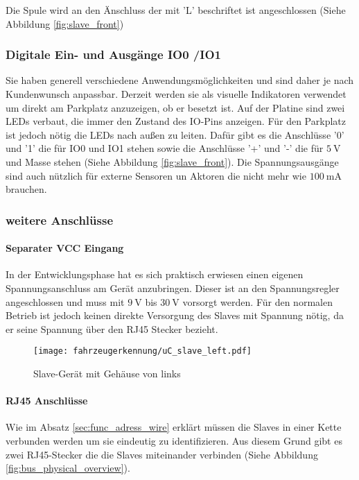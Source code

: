 Die Spule wird an den Änschluss der mit 'L' beschriftet ist angeschlossen (Siehe Abbildung \ref{fig:slave_front})

\subsubsection{Digitale Ein- und Ausgänge IO0 /IO1}

Sie haben generell verschiedene Anwendungsmöglichkeiten und sind daher je nach Kundenwunsch anpassbar. Derzeit werden sie als visuelle Indikatoren verwendet um direkt am Parkplatz anzuzeigen, ob er besetzt ist. 
Auf der Platine sind zwei LEDs verbaut, die immer den Zustand des IO-Pins anzeigen. Für den Parkplatz ist jedoch nötig die LEDs nach außen zu leiten. Dafür gibt es die Anschlüsse '0' und '1' die für IO0 und IO1 stehen sowie die Anschlüsse
'+' und '-' die für $\SI{5}{\volt}$ und Masse stehen (Siehe Abbildung \ref{fig:slave_front}). Die Spannungsausgänge sind auch nützlich für externe Sensoren un Aktoren die nicht mehr wie $\SI{100}{\milli\ampere}$ brauchen.

\subsubsection{weitere Anschlüsse}
\paragraph{Separater VCC Eingang}\mbox{} 

In der Entwicklungsphase hat es sich praktisch erwiesen einen eigenen Spannungsanschluss am Gerät anzubringen. Dieser ist an den Spannungsregler angeschlossen und muss mit $\SI{9}{\volt}$ bis $\SI{30}{\volt}$ vorsorgt werden.
Für den normalen Betrieb ist jedoch keinen direkte Versorgung des Slaves mit Spannung nötig, da er seine Spannung über den RJ45 Stecker bezieht.

\begin{figure}[H]
    \centering
    \texttt{[image: fahrzeugerkennung/uC\_slave\_left.pdf]}
    \caption{Slave-Gerät mit Gehäuse von links}
    \label{fig:slave_left}
\end{figure}

\paragraph{RJ45 Anschlüsse}\mbox{} 

Wie im Absatz \ref{sec:func_adress_wire} erklärt müssen die Slaves in einer Kette verbunden werden um sie eindeutig zu identifizieren. Aus diesem Grund gibt es zwei RJ45-Stecker die die Slaves miteinander verbinden (Siehe Abbildung \ref{fig:bus_physical_overview}).


